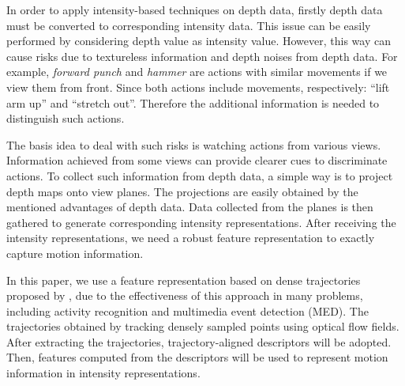 \documentclass[review]{elsarticle}
\begin{document}
In order to apply intensity-based techniques on depth data, firstly depth data must be converted to corresponding intensity data. This issue can be easily performed by considering depth value as intensity value. However, this way can cause risks due to textureless information and depth noises from depth data. For example, \textit{forward punch} and \textit{hammer} are actions with similar movements if we view them from front. Since both actions include movements, respectively: ``lift arm up'' and ``stretch out''. Therefore the additional information is needed to distinguish such actions.

The basis idea to deal with such risks is watching actions from various views. Information achieved from some views can provide clearer cues to discriminate actions. To collect such information from depth data, a simple way is to project depth maps onto view planes. The projections are easily obtained by the mentioned advantages of depth data. Data collected from the planes is then gathered to generate corresponding intensity representations. After receiving the intensity representations, we need a robust feature representation to exactly capture motion information.

In this paper, we use a feature representation based on dense trajectories proposed by \cite{wang2011densetraj}, due to the effectiveness of this approach in many problems, including  activity recognition and multimedia event detection (MED). The trajectories obtained by tracking densely sampled points using optical flow fields. After extracting the trajectories, trajectory-aligned descriptors will be adopted. Then, features computed from the descriptors will be used to represent motion information in intensity representations.
\end{document}

